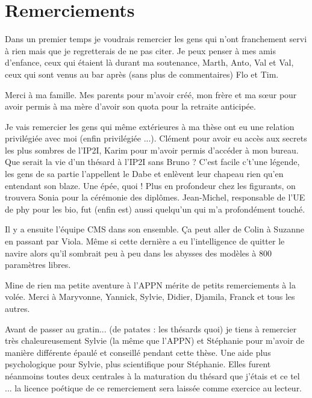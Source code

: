 
\begingroup
\let\clearpage\relax
\let\cleardoublepage\relax
\let\cleardoublepage\relax
\chapter*{Remerciements}

Dans un premier temps je voudrais remercier les gens qui n'ont franchement servi à rien mais que je regretterais de ne pas citer. 
Je peux penser à mes amis d'enfance, ceux qui étaient là durant ma soutenance, Marth, Anto, Val et Val, ceux qui sont venus au bar après (sans plus de commentaires) Flo et Tim. 
\newline

Merci à ma famille. Mes parents pour m'avoir créé, mon frère et ma sœur pour avoir permis à ma mère d'avoir son quota pour la retraite anticipée.
\newline

Je vais remercier les gens qui même extérieures à ma thèse ont eu une relation privilégiée avec moi (enfin privilégiée ...). Clément pour avoir eu accès aux secrets les plus sombres de l'IP2I, Karim pour m'avoir permis d'accéder à mon bureau. Que serait la vie d'un thésard à l'IP2I sans Bruno ? C'est facile c't'une légende, les gens de sa partie l'appellent le Dabe et enlèvent leur chapeau rien qu'en entendant son blaze. Une épée, quoi ! Plus en profondeur chez les figurants, on trouvera Sonia pour la cérémonie des diplômes. Jean-Michel, responsable de l'UE de phy pour les bio, fut (enfin est) aussi quelqu'un qui m'a profondément touché.
\newline

Il y a ensuite l'équipe CMS dans son ensemble. Ça peut aller de Colin à Suzanne en passant par Viola. Même si cette dernière a eu l'intelligence de quitter le navire alors qu'il sombrait peu à peu dans les abysses des modèles à 800 paramètres libres. 
\newline

Mine de rien ma petite aventure à l'APPN mérite de petits remerciements à la volée. Merci à Maryvonne, Yannick, Sylvie, Didier, Djamila, Franck et tous les autres.
\newline

Avant de passer au gratin... (de patates : les thésards quoi) je tiens à remercier très chaleureusement Sylvie (la même que l'APPN) et Stéphanie pour m'avoir de manière différente épaulé et conseillé pendant cette thèse. Une aide plus psychologique pour Sylvie, plus scientifique pour Stéphanie. Elles furent néanmoins toutes deux centrales à la maturation du thésard que j'étais et ce tel ... la licence poétique de ce remerciement sera laissée comme exercice au lecteur. 
\newline

